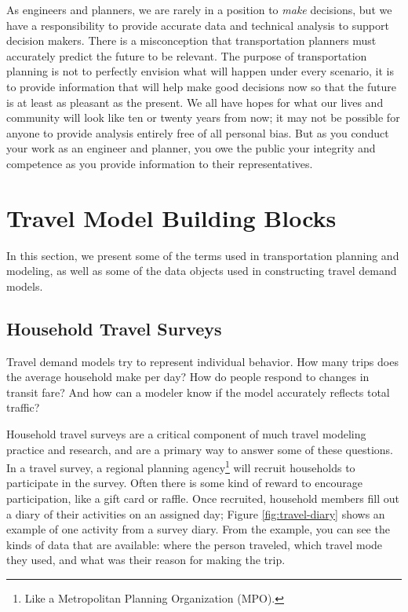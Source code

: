 \documentclass[]{book}
\let\rmarkdownfootnote\footnote%
\def\footnote{\protect\rmarkdownfootnote}
\begin{document}
As engineers and planners, we are rarely in a position to \emph{make} decisions, but
we have a responsibility to provide accurate data and technical analysis to
support decision makers. There is a misconception that transportation planners
must accurately predict the future to be relevant. The purpose of transportation
planning is not to perfectly envision what will happen under every scenario,
it is to provide information that will help make good decisions now so that
the future is at least as pleasant as the present. We all have hopes for what
our lives and community will look like ten or twenty years from now; it may not
be possible for anyone to provide analysis entirely free of all personal bias.
But as you conduct your work as an engineer and planner, you owe the public your
integrity and competence as you provide information to their representatives.

\hypertarget{travel-model-building-blocks}{%
\section{Travel Model Building Blocks}\label{travel-model-building-blocks}}

In this section, we present some of the terms used in transportation planning
and modeling, as well as some of the data objects used in constructing travel
demand models.

\hypertarget{household-travel-surveys}{%
\subsection{Household Travel Surveys}\label{household-travel-surveys}}

Travel demand models try to represent individual behavior. How many trips
does the average household make per day? How do people respond to changes in
transit fare? And how can a modeler know if the model accurately reflects
total traffic?

Household travel surveys are a critical component of much travel modeling
practice and research, and are a primary way to answer some of these questions.
In a travel survey, a regional planning
agency\footnote{Like a Metropolitan Planning Organization (MPO).} will recruit households
to participate in the survey. Often there is some kind of reward to encourage
participation, like a gift card or raffle. Once recruited, household members
fill out a diary of their activities on an assigned day; Figure
\ref{fig:travel-diary} shows an example of one activity from a survey diary.
From the example, you can see the kinds of data that are available: where the
person traveled, which travel mode they used, and what was their reason for
making the trip.
\end{document}
